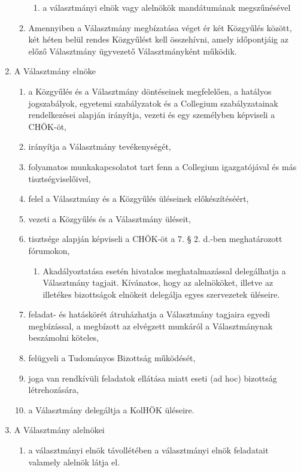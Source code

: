 \documentclass{../styles/rulebook}
\begin{document}
\begin{enumerate}
\begin{enumerate}
\begin{enumerate}
			\item a választmányi elnök vagy alelnökök mandátumának megszűnésével
		\end{enumerate}
		\item Amennyiben a Választmány megbízatása véget ér két Közgyűlés között, két héten belül rendes Közgyűlést kell összehívni, amely időpontjáig az előző Választmány ügyvezető Választmányként működik.
	\end{enumerate}
	\item A Választmány elnöke
	\begin{enumerate}	
		\item a Közgyűlés és a Választmány döntéseinek megfelelően, a hatályos jogszabályok, egyetemi szabályzatok és a Collegium szabályzatainak rendelkezései alapján irányítja, vezeti és egy személyben képviseli a CHÖK-öt,
		\item irányítja a Választmány tevékenységét,
		\item folyamatos munkakapcsolatot tart fenn a Collegium igazgatójával és más tisztségviselőivel,
		\item felel a Választmány és a Közgyűlés üléseinek előkészítéséért, 
		\item vezeti a Közgyűlés és a Választmány üléseit,
		\item tisztsége alapján képviseli a CHÖK-öt a 7. § 2. d.-ben meghatározott fórumokon,
		\begin{enumerate}
			\item Akadályoztatása esetén hivatalos meghatalmazással delegálhatja a Választmány tagjait. Kívánatos, hogy az alelnököket, illetve az illetékes bizottságok elnökeit delegálja egyes szervezetek üléseire.
		\end{enumerate}
		\item feladat- és hatáskörét átruházhatja a Választmány tagjaira egyedi megbízással, a megbízott az elvégzett munkáról a Választmánynak beszámolni köteles,
		\item felügyeli a Tudományos Bizottság működését,
		\item joga van rendkívüli feladatok ellátása miatt eseti (ad hoc) bizottság létrehozására,
		\item a Választmány delegáltja a KolHÖK üléseire.
	\end{enumerate}
	\item A Választmány alelnökei
		\begin{enumerate}
		\item a választmányi elnök távollétében a választmányi elnök feladatait valamely alelnök látja el.

\end{enumerate}
\end{enumerate}
\end{document}
